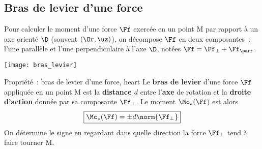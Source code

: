 \documentclass[../main/main.tex]{subfiles}
\begin{document}
\subsection{Bras de levier d'une force}
Pour calculer le moment d'une force $\Ff$ exercée en un point M par rapport à un
axe orienté $\D$ (souvent $(\Or,\uz)$), on décompose $\Ff$ en deux composantes~:
l'une parallèle et l'une perpendiculaire à l'axe $\D$, notées $\Ff = \Ff_{\perp}
+ \Ff_{\parr}$. \smallbreak
\begin{center}
    \texttt{[image: bras\_levier]}
\end{center}
\begin{tprop}{Propriété~: bras de levier d'une force, heart}
    Le \textbf{bras de levier} d'une force $\Ff$ appliquée en un point M est la
    \textbf{distance $d$} entre l'\textbf{axe} de rotation et la \textbf{droite
    d'action} donnée par sa composante $\Ff_{\perp}$. Le moment $\Mc_z(\Ff)$ est
    alors
    \[\boxed{\Mc_z(\Ff) = \pm d\norm{\Ff_{\perp}}}\]
    On détermine le signe en regardant dans quelle direction la force
    $\Ff_{\perp}$ tend à faire tourner M.
\end{tprop}
\end{document}
